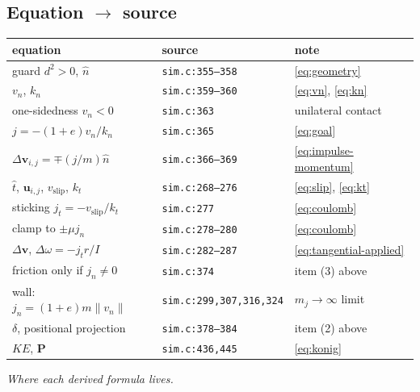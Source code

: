 \documentclass[a4paper,11pt]{article}
\newcommand{\vV}{\bm{v}}
\newcommand{\hh}{\hat{n}}
\newcommand{\ttt}{\hat{t}}
\newcommand{\PP}{\bm{P}}          %
\begin{document}
\subsection{Equation $\to$ source}
\begin{center}
\scriptsize
\begin{tabular}{@{}lll@{}}
\toprule
equation & source & note \\
\midrule
guard $d^2>0$, $\hh$            & \texttt{sim.c:355--358} & \eqref{eq:geometry} \\
$v_n$, $k_n$                   & \texttt{sim.c:359--360} & \eqref{eq:vn}, \eqref{eq:kn} \\
one-sidedness $v_n<0$          & \texttt{sim.c:363}      & unilateral contact \\
$j=-(1+e)v_n/k_n$              & \texttt{sim.c:365}      & \eqref{eq:goal} \\
$\Delta\vV_{i,j}=\mp(j/m)\hh$  & \texttt{sim.c:366--369} & \eqref{eq:impulse-momentum} \\
$\ttt$, $\bm u_{i,j}$, $v_{\text{slip}}$, $k_t$
                               & \texttt{sim.c:268--276} & \eqref{eq:slip}, \eqref{eq:kt} \\
sticking $j_t=-v_{\text{slip}}/k_t$ & \texttt{sim.c:277} & \eqref{eq:coulomb} \\
clamp to $\pm\mu j_n$          & \texttt{sim.c:278--280} & \eqref{eq:coulomb} \\
$\Delta\vV$, $\Delta\omega=-j_t r/I$ & \texttt{sim.c:282--287} & \eqref{eq:tangential-applied} \\
friction only if $j_n\neq0$    & \texttt{sim.c:374}      & item (3) above \\
wall: $j_n=(1+e)m\|v_n\|$      & \texttt{sim.c:299,307,316,324} & $m_j\to\infty$ limit \\
$\delta$, positional projection& \texttt{sim.c:378--384} & item (2) above \\
$KE$, $\PP$                  & \texttt{sim.c:436,445}  & \eqref{eq:konig} \\
\bottomrule
\end{tabular}

\vspace{4pt}
{\small\itshape Where each derived formula lives.}
\end{center}

\end{document}
